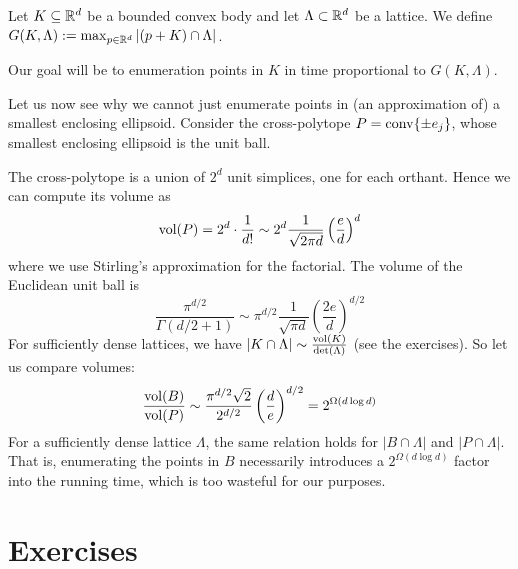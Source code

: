 \begin{definition}
  Let $K \subseteq \mathbb{R}^d $ be a bounded convex body and let $\Lambda \subset \mathbb{R}^d$ be a lattice.
  We define $G(K,\Lambda) := \max_{p \in \mathbb{R}^d} |(p + K) \cap \Lambda|$.
\end{definition}

Our goal will be to enumeration points in $K$ in time proportional to $G(K, \Lambda)$.

Let us now see why we cannot just enumerate points in (an approximation of)
a smallest enclosing ellipsoid.
Consider the cross-polytope $P = \operatorname{conv}\{\pm e_j\}$,
whose smallest enclosing ellipsoid is the unit ball.
\begin{center}
\end{center}
The cross-polytope is a union of $2^d$ unit simplices,
one for each orthant.
Hence we can compute its volume as
\[
  \operatorname{vol}(P) = 2^d \cdot \frac{1}{d!} \sim 2^d \frac{1}{\sqrt{2\pi d}} \left( \frac{e}{d} \right)^d
\]
where we use Stirling's approximation for the factorial.
The volume of the Euclidean unit ball is
\[
  \frac{\pi^{d/2}}{\Gamma(d/2 + 1)} \sim \pi^{d/2} \frac{1}{\sqrt{\pi d}} \left( \frac{2e}{d} \right)^{d/2}
\]
For sufficiently dense lattices, we have
$|K \cap \Lambda| \sim \frac{\operatorname{vol}(K)}{\det(\Lambda)}$ (see the exercises).
So let us compare volumes:
\[
  \frac{\operatorname{vol}(B)}{\operatorname{vol}(P)} \sim \frac{\pi^{d/2} \sqrt{2}}{2^{d/2}} \left( \frac{d}{e} \right)^{d/2} = 2^{\Omega(d \log d)}
\]
For a sufficiently dense lattice $\Lambda$,
the same relation holds for $|B \cap \Lambda|$ and $|P \cap \Lambda|$.
That is, enumerating the points in $B$ necessarily introduces a $2^{\Omega(d \log d)}$ factor into the running time,
which is too wasteful for our purposes.





\section*{Exercises}

